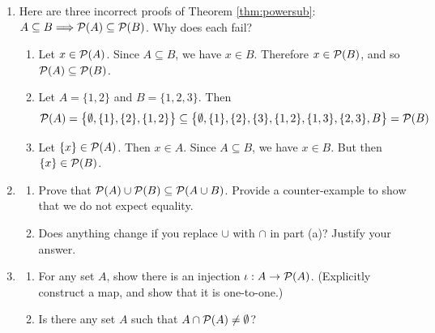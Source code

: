 \begin{exercises}{}{}
\begin{enumerate}
	
		\item\label{ex:powersub1} Here are three incorrect proofs of Theorem \ref{thm:powersub}: $A\subseteq B\Longrightarrow\mathcal{P}(A)\subseteq\mathcal{P}(B)$. Why does each fail?
		\begin{enumerate}
			\item Let $x\in\mathcal{P}(A)$. Since $A\subseteq B$, we have $x\in B$. Therefore $x\in\mathcal{P}(B)$, and so $\mathcal{P}(A)\subseteq\mathcal{P}(B)$.
			\item Let $A=\{1,2\}$ and $B=\{1,2,3\}$. Then
			\[
				\mathcal{P}(A)=\bigl\{\emptyset,\{1\},\{2\},\{1,2\}\bigr\} \subseteq \bigl\{\emptyset,\{1\},\{2\},\{3\},\{1,2\},\{1,3\},\{2,3\},B\bigr\}
				=\mathcal{P}(B)
			\]
			\item Let $\{x\}\in\mathcal{P}(A)$. Then $x\in A$. Since $A\subseteq B$, we have $x\in B$. But then $\{x\}\in\mathcal{P}(B)$.
		\end{enumerate}
	
	
		\item\begin{enumerate}
		  \item Prove that $\mathcal{P}(A)\cup\mathcal{P}(B)\subseteq\mathcal{P}(A\cup B)$. Provide a counter-example to show that we do not expect equality.
		  \item Does anything change if you replace $\cup$ with $\cap$ in part (a)? Justify your answer.
		\end{enumerate}
	
	
	
 
		\item\begin{enumerate}
			\item For any set $A$, show there is an injection $\iota : A \to \mathcal{P}(A)$. (Explicitly construct a map, and show that it is one-to-one.)
			\item Is there any set $A$ such that $A \cap \mathcal{P}(A) \neq \emptyset$?
		\end{enumerate}

% 


\end{enumerate}
\end{exercises}
